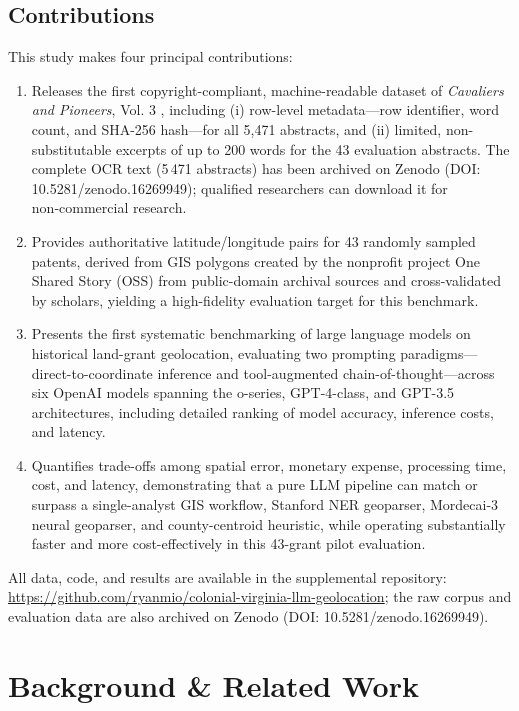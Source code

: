 \subsection{Contributions}\label{contributions}

This study makes four principal contributions:

\begin{enumerate}
\def\labelenumi{\arabic{enumi}.}
\tightlist
\item
  Releases the first copyright-compliant, machine-readable dataset of
  \emph{Cavaliers and Pioneers}, Vol. 3 \citep{Nugent1979_cavaliers3},
  including (i) row-level metadata---row identifier, word count, and
  SHA-256 hash---for all 5,471 abstracts, and (ii) limited,
  non-substitutable excerpts of up to 200 words for the 43 evaluation
  abstracts. The complete OCR text (5\,471 abstracts) has been archived
  on Zenodo (DOI: 10.5281/zenodo.16269949); qualified researchers can
  download it for non‑commercial research.
\item
  Provides authoritative latitude/longitude pairs for 43 randomly
  sampled patents, derived from GIS polygons created by the nonprofit
  project One Shared Story (OSS) from public-domain archival sources and
  cross-validated by scholars, yielding a high-fidelity evaluation
  target for this benchmark.
\item
  Presents the first systematic benchmarking of large language models on
  historical land-grant geolocation, evaluating two prompting
  paradigms---direct-to-coordinate inference and tool-augmented
  chain-of-thought---across six OpenAI models spanning the o-series,
  GPT-4-class, and GPT-3.5 architectures, including detailed ranking of
  model accuracy, inference costs, and latency.
\item
  Quantifies trade-offs among spatial error, monetary expense,
  processing time, cost, and latency, demonstrating that a pure LLM
  pipeline can match or surpass a single-analyst GIS workflow, Stanford
  NER geoparser, Mordecai-3 neural geoparser, and county-centroid
  heuristic, while operating substantially faster and more
  cost-effectively in this 43-grant pilot evaluation.
\end{enumerate}

All data, code, and results are available in the supplemental
repository:
\url{https://github.com/ryanmio/colonial-virginia-llm-geolocation}; the
raw corpus and evaluation data are also archived on Zenodo (DOI:
10.5281/zenodo.16269949).

\section{Background \& Related Work}\label{background-related-work}

